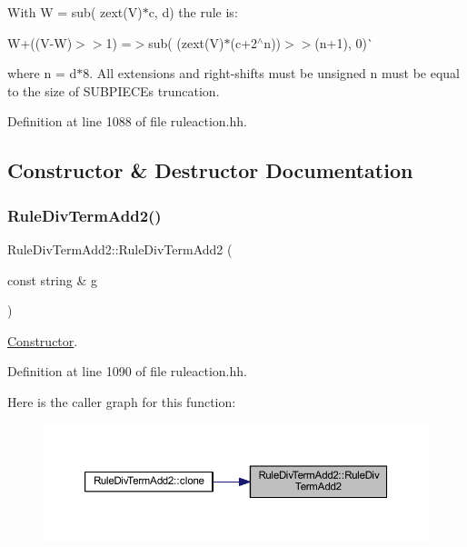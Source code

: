 With {\ttfamily W = sub( zext(\+V)$\ast$c, d)} the rule is\+:
\begin{DoxyItemize}
\item {\ttfamily W+((V-\/W)$>$$>$1) =$>$}sub( (zext(\+V)$\ast$(c+2$^\wedge$n))$>$$>$(n+1), 0)\`{}
\end{DoxyItemize}

where n = d$\ast$8. All extensions and right-\/shifts must be unsigned n must be equal to the size of S\+U\+B\+P\+I\+E\+CE\textquotesingle{}s truncation. 

Definition at line 1088 of file ruleaction.\+hh.



\subsection{Constructor \& Destructor Documentation}
\mbox{\label{class_rule_div_term_add2_a0807064b337e0e8660602b22f839b7e0}} 
\subsubsection{\texorpdfstring{RuleDivTermAdd2()}{RuleDivTermAdd2()}}
{\footnotesize\ttfamily Rule\+Div\+Term\+Add2\+::\+Rule\+Div\+Term\+Add2 (\begin{DoxyParamCaption}\item[{const string \&}]{g }\end{DoxyParamCaption})\hspace{0.3cm}{\ttfamily [inline]}}



\mbox{\hyperlink{class_constructor}{Constructor}}. 



Definition at line 1090 of file ruleaction.\+hh.

Here is the caller graph for this function\+:
\nopagebreak
\begin{figure}[H]
\begin{center}
\leavevmode
\includegraphics[width=350pt]{class_rule_div_term_add2_a0807064b337e0e8660602b22f839b7e0_icgraph}
\end{center}
\end{figure}


